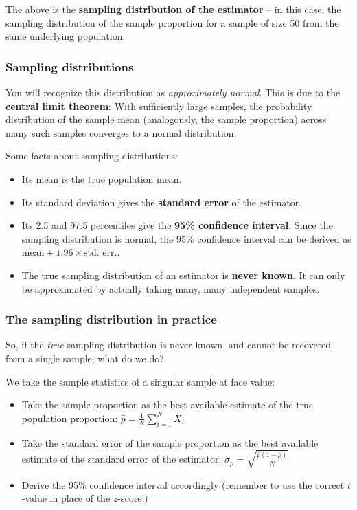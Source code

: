 \documentclass[
  11pt,
]{article}
\providecommand{\tightlist}{%
  \setlength{\itemsep}{0pt}\setlength{\parskip}{0pt}}
\begin{document}
The above is the \textbf{sampling distribution of the estimator} -- in this case, the sampling distribution of the sample proportion for a sample of size 50 from the same underlying population.

\hypertarget{sampling-distributions}{%
\subsubsection{Sampling distributions}\label{sampling-distributions}}

You will recognize this distribution as \emph{approximately normal}. This is due to the \textbf{central limit theorem}: With sufficiently large samples, the probability distribution of the sample mean (analogously, the sample proportion) across many such samples converges to a normal distribution.

Some facts about sampling distributions:

\begin{itemize}
\tightlist
\item
  Its mean is the true population mean.
\item
  Its standard deviation gives the \textbf{standard error} of the estimator.
\item
  Its 2.5 and 97.5 percentiles give the \textbf{95\% confidence interval}. Since the sampling distribution is normal, the 95\% confidence interval can be derived as \(\text{mean} \pm 1.96 \times \text{std. err.}\).
\item
  The true sampling distribution of an estimator is \textbf{never known}. It can only be approximated by actually taking many, many independent samples.
\end{itemize}

\hypertarget{the-sampling-distribution-in-practice}{%
\subsubsection{The sampling distribution in practice}\label{the-sampling-distribution-in-practice}}

So, if the \emph{true} sampling distribution is never known, and cannot be recovered from a single sample, what do we do?

We take the sample statistics of a singular sample at face value:

\begin{itemize}
\tightlist
\item
  Take the sample proportion as the best available estimate of the true population proportion: \(\hat{p} = \frac{1}{N}\sum_{i=1}^{N} X_i\)
\item
  Take the standard error of the sample proportion as the best available estimate of the standard error of the estimator: \(\hat{\sigma}_p = \sqrt{\frac{\hat{p} (1- \hat{p})}{N}}\)
\item
  Derive the 95\% confidence interval accordingly (remember to use the correct \(t\)-value in place of the \(z\)-score!)
\end{itemize}
\end{document}
